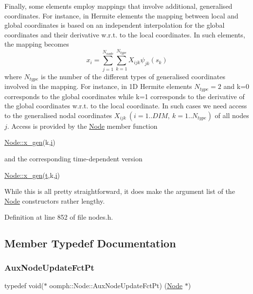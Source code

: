Finally, some elements employ mappings that involve additional, generalised coordinates. For instance, in Hermite elements the mapping between local and global coordinates is based on an independent interpolation for the global coordinates and their derivative w.\+r.\+t. to the local coordinates. In such elements, the mapping becomes \[ x_i = \sum_{j=1}^{N_{node}} \sum_{k=1}^{N_{type}} X_{ijk} \psi_{jk}(s_k) \] where $ N_{type} $ is the number of the different types of generalised coordinates involved in the mapping. For instance, in 1D Hermite elements $ N_{type}=2 $ and k=0 corresponds to the global coordinates while k=1 corresponds to the derivative of the global coordinates w.\+r.\+t. to the local coordinate. In such cases we need access to the generalised nodal coordinates $ X_{ijk} \ (i=1..DIM, \ k=1..N_{type}) $ of all nodes $ j $. Access is provided by the \hyperlink{classoomph_1_1Node}{Node} member function 
\begin{DoxyCode}
\hyperlink{classoomph_1_1Node_a072d2dc645e03ccd18061a5c616aa6af}{Node::x\_gen}(k,\hyperlink{cfortran_8h_adb50e893b86b3e55e751a42eab3cba82}{i}) 
\end{DoxyCode}
 and the corresponding time-\/dependent version 
\begin{DoxyCode}
\hyperlink{classoomph_1_1Node_a072d2dc645e03ccd18061a5c616aa6af}{Node::x\_gen}(\hyperlink{cfortran_8h_af6f0bd3dc13317f895c91323c25c2b8f}{t},k,\hyperlink{cfortran_8h_adb50e893b86b3e55e751a42eab3cba82}{i}) 
\end{DoxyCode}
 While this is all pretty straightforward, it does make the argument list of the \hyperlink{classoomph_1_1Node}{Node} constructors rather lengthy. 

Definition at line 852 of file nodes.\+h.



\subsection{Member Typedef Documentation}
\mbox{\label{classoomph_1_1Node_afcc4cc3e1e48964baf23fa44c98293a9}} 
\subsubsection{\texorpdfstring{Aux\+Node\+Update\+Fct\+Pt}{AuxNodeUpdateFctPt}}
{\footnotesize\ttfamily typedef void($\ast$ oomph\+::\+Node\+::\+Aux\+Node\+Update\+Fct\+Pt) (\hyperlink{classoomph_1_1Node}{Node} $\ast$)}



